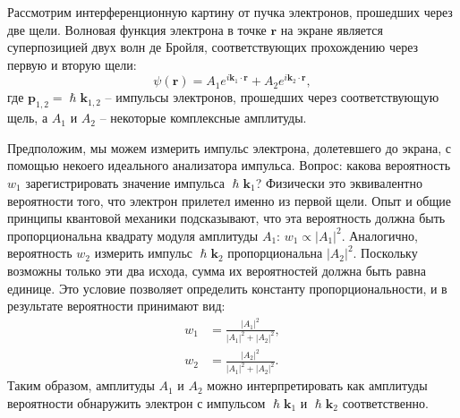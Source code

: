 \documentclass[a4paper, 12pt]{article}
\begin{document}
Рассмотрим интерференционную картину от пучка электронов, прошедших через две щели. Волновая функция электрона в точке $\bm{r}$ на экране является суперпозицией двух волн де Бройля, соответствующих прохождению через первую и вторую щели:
\begin{equation}
\psi(\bm{r}) = A_1 e^{i \bm{k}_1 \cdot \bm{r}} + A_2 e^{i \bm{k}_2 \cdot \bm{r}},
\end{equation}
где $\bm{p}_{1,2} = \hslash \bm{k}_{1,2}$ -- импульсы электронов, прошедших через соответствующую щель, а $A_1$ и $A_2$ -- некоторые комплексные амплитуды.

Предположим, мы можем измерить импульс электрона, долетевшего до экрана, с помощью некоего идеального анализатора импульса. Вопрос: какова вероятность $w_1$ зарегистрировать значение импульса $\hslash \bm{k}_1$? Физически это эквивалентно вероятности того, что электрон прилетел именно из первой щели. Опыт и общие принципы квантовой механики подсказывают, что эта вероятность должна быть пропорциональна квадрату модуля амплитуды $A_1$: $w_1 \propto |A_1|^2$. Аналогично, вероятность $w_2$ измерить импульс $\hslash \bm{k}_2$ пропорциональна $|A_2|^2$. Поскольку возможны только эти два исхода, сумма их вероятностей должна быть равна единице. Это условие позволяет определить константу пропорциональности, и в результате вероятности принимают вид:
\begin{align}
w_1 &= \frac{|A_1|^2}{|A_1|^2 + |A_2|^2}, \\
w_2 &= \frac{|A_2|^2}{|A_1|^2 + |A_2|^2}.
\end{align}
Таким образом, амплитуды $A_1$ и $A_2$ можно интерпретировать как амплитуды вероятности обнаружить электрон с импульсом $\hslash \bm{k}_1$ и $\hslash \bm{k}_2$ соответственно.
\end{document}
